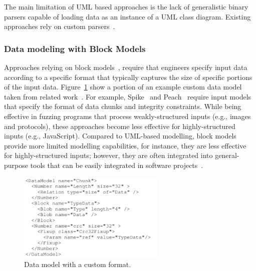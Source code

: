 The main limitation of UML based approaches is the lack of generalistic binary parsers capable of loading data as an instance of a UML class diagram. Existing approaches rely on custom parsers~\cite{di2015generating,di2015evolutionary}.

\subsubsection{Data modeling with Block Models}

Approaches relying on block models~\cite{PeachFuzzer,spike,pham2016model}, require that engineers specify input data according to a specific format that typically captures the size of specific portions of the input data. 
Figure~\ref{fig:pit} show a portion of an example custom data model taken from related work~\cite{pham2016model}.
For example, Spike~\cite{spike} and Peach~\cite{PeachFuzzer} require input models that specify the format of data chunks and integrity constraints. 
While being effective in fuzzing programs that process weakly-structured inputs (e.g., images and protocols), these approaches become less effective for highly-structured inputs (e.g., JavaScript).
Compared to UML-based modelling, block models provide more limited modelling capabilities, for instance, they are less effective for highly-structured inputs; however, they are often integrated into general-purpose tools that can be easily integrated in software projects~\cite{PeachFuzzer}.


\begin{figure}[t!]
  \centering
    \includegraphics[width=7cm]{images/PeachPit}
      \caption{Data model with a custom format.}
      \label{fig:pit}
\end{figure}
